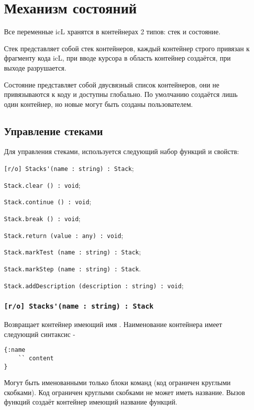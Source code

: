 \section{Механизм состояний}

Все переменные icL хранятся в контейнерах 2 типов: стек и состояние.

Стек представляет собой стек контейнеров, каждый контейнер строго привязан к фрагменту кода icL, при вводе курсора в область контейнер создаётся, при выходе разрушается.

Состояние представляет собой двусвязный список контейнеров, они не привязываются к коду и доступны глобально. По умолчанию создаётся лишь один контейнер, но новые могут быть созданы пользователем.

\subsection{Управление стеками}

Для управления стеками, используется следующий набор функций и свойств:
\begin{icItems}
	\item \lstinline|[r/o] Stacks'(name : string) : Stack|;
	\item \lstinline|Stack.clear () : void|;
	\item \lstinline|Stack.continue () : void|;
	\item \lstinline|Stack.break () : void|;
	\item \lstinline|Stack.return (value : any) : void|;
	\item \lstinline|Stack.markTest (name : string) : Stack|;
	\item \lstinline|Stack.markStep (name : string) : Stack|.
	\item \lstinline|Stack.addDescription (description : string) : void|;
\end{icItems}

\subsubsection{\lstinline|[r/o] Stacks'(name : string) : Stack|}

Возвращает контейнер имеющий имя . Наименование контейнера имеет следующий синтаксис -
\begin{lstlisting}[numbers=none]
{:name
	`` content
}
\end{lstlisting}
Могут быть именованными только блоки команд (код ограничен круглыми скобками). Код ограничен круглыми скобками не может иметь название. Вызов функций создаёт контейнер имеющий название функций.

